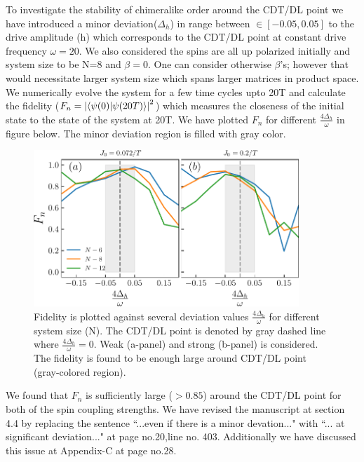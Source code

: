 \documentclass[aps,prb,reprint,showpacs,floatfix,superscriptaddress, onecolumn, nofootinbib, 10pt]{revtex4-2}
\begin{document}
\begin{enumerate}
\begin{enumerate}
\begin{enumerate}
{			To investigate the stability of chimeralike order around the CDT/DL point we have introduced a minor deviation($\Delta_h$) in range between $\in[-0.05, 0.05]$ to the drive amplitude (h) which corresponds to the CDT/DL point at constant drive frequency $\omega = 20$. We also considered the spins are all up polarized initially and system size to be N=8 and $\beta=0$. One can consider otherwise $\beta$'s; however that would necessitate larger system size which spans larger matrices in product space. We numerically evolve the system for a few time cycles upto 20T and calculate the fidelity ($F_n = \abs{\braket{\psi(0)}{\psi (20T)}}^2$) which measures the closeness of the initial state  to the state of the system at 20T. We have plotted $F_n$ for different $\frac{4\Delta_h}{\omega}$ in figure below. The minor deviation region is filled with gray color. 
			\begin{figure}[h!]
				\begin{center}
					\includegraphics[width=10cm]{./figs/figure14.pdf}
				\end{center}
				\caption{Fidelity is plotted against several deviation values $\frac{4\Delta_h}{\omega}$ for different system size (N). The CDT/DL point is denoted by gray dashed line where $\frac{4\Delta_h}{\omega}=0$. Weak (a-panel) and strong (b-panel) is considered. The fidelity is found to be enough large around CDT/DL point (gray-colored region).}
				\label{Fig:aroundCDT}
			\end{figure}
			We found that $F_n$ is sufficiently large ($>0.85$) around the CDT/DL point for both of the spin coupling strengths. We have revised the manuscript at section 4.4 by replacing the sentence ``...even if there is a minor devation..." with ``... at significant deviation..." at page no.20,line no. 403. Additionally we have discussed this issue at Appendix-C at page no.28. 
			}
		\end{enumerate}
	

\end{enumerate}
\end{enumerate}
\end{document}
